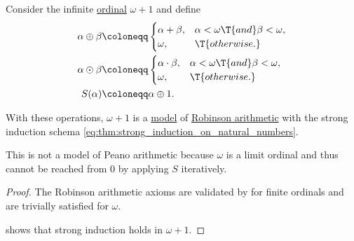 \begin{proposition}\label{thm:omega_plus_one_model_of_robinson_arithmetic}
  Consider the infinite \hyperref[def:ordinal]{ordinal} \( \omega + 1 \) and define
  \begin{align*}
    \alpha \oplus \beta &\coloneqq \begin{cases}
      \alpha + \beta, &\alpha < \omega \T{and} \beta < \omega, \\
      \omega,         &\T{otherwise.}
    \end{cases} \\
    \alpha \odot \beta &\coloneqq \begin{cases}
      \alpha \cdot \beta, &\alpha < \omega \T{and} \beta < \omega, \\
      \omega,         &\T{otherwise.}
    \end{cases} \\
    S(\alpha) &\coloneqq \alpha \oplus 1.
  \end{align*}

  With these operations, \( \omega + 1 \) is a \hyperref[def:fol_semantics/model]{model} of \hyperref[def:peano_arithmetic]{Robinson arithmetic} with the strong induction schema \eqref{eq:thm:strong_induction_on_natural_numbers}.
\end{proposition}
\begin{comments}
  \item This is not a model of Peano arithmetic because \( \omega \) is a limit ordinal and thus cannot be reached from \( 0 \) by applying \( S \) iteratively.
\end{comments}
\begin{proof}
  The Robinson arithmetic axioms are validated by  for finite ordinals and are trivially satisfied for \( \omega \).

   shows that strong induction holds in \( \omega + 1 \).
\end{proof}

